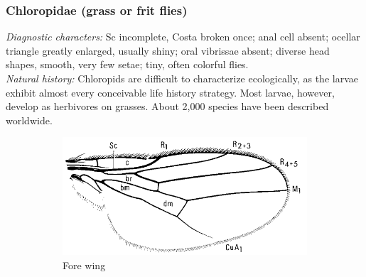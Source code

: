 \documentclass[letterpaper, 11pt]{article}
\begin{document}
\subsubsection{Chloropidae (grass or frit flies)}
\noindent{}\textit{Diagnostic characters:} Sc incomplete, Costa broken once; anal cell absent; ocellar triangle greatly enlarged, usually shiny; oral vibrissae absent; diverse head shapes, smooth, very few setae; tiny, often colorful flies.\\

\noindent{}\textit{Natural history:} Chloropids are difficult to characterize ecologically, as the larvae exhibit almost every conceivable life history strategy. Most larvae, however, develop as herbivores on grasses. About 2,000 species have been described worldwide.

\begin{figure}[ht!]
    \centering
    \begin{subfigure}[ht!]{0.5\textwidth}
        \includegraphics[width=\textwidth]{ChloropidWing}
        \caption{Fore wing \citep[][Fig. 99.36]{mcalpine1981manualv2}}
        \label{fig:chloropid1}
    \end{subfigure}
    \qquad
    \begin{subfigure}[ht!]{0.25\textwidth}

\end{subfigure}
\end{figure}
\end{document}
